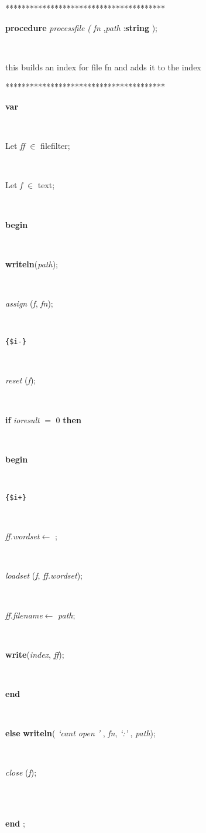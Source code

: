 \documentclass[10pt, a4paper]{article}
\begin{document}
\begin{tabbing}
***\=***\=***\=***\=***\=***\=***\=***\=***\=***\=***\=***\=***\=\kill
\parbox{14cm}{\textsf{\textbf{procedure}  \textit{processfile} \textit{(} \textit{fn} ,\textit{path} :\textbf{string} );}}\\
\end{tabbing}
this builds an index for file fn and adds it to the index
\begin{tabbing}
***\=***\=***\=***\=***\=***\=***\=***\=***\=***\=***\=***\=***\=\kill
\\
\+\parbox{14cm}{\textsf{\textbf{var} }}\\
\parbox{14cm}{\textsf{Let \textit{ff} $\in$ filefilter;}}\\
\parbox{14cm}{\textsf{Let \textit{f} $\in$ text;}}\\
\-\<\+\parbox{14cm}{\textsf{\textbf{begin} }}\\
\parbox{14cm}{\textsf{\textbf{writeln}(\textit{path})}; }\\
\parbox{14cm}{\textsf{\textit{assign} (\textit{f}, \textit{fn})}; }\\
\parbox{14cm}{\texttt{\small{\{\$i-\}}}}\\
\parbox{14cm}{\textsf{\textit{reset} (\textit{f})}; }\\
\+\parbox{14cm}{\textsf {\textbf {if } \textsf{\textit{ioresult} $=$ 0} \textbf{ then } }}\\
\<\parbox{14cm}{\textsf{\textbf{begin} }}\\
\parbox{14cm}{\texttt{\small{\{\$i+\}}}}\\
\parbox{14cm}{\textsf{\textit{ff.wordset}$\leftarrow$ \textit{}}; }\\
\parbox{14cm}{\textsf{\textit{loadset} (\textit{f}, \textit{ff.wordset})}; }\\
\parbox{14cm}{\textsf{\textit{ff.filename}$\leftarrow$ \textit{path}}; }\\
\parbox{14cm}{\textsf{\textbf{write}(\textit{index}, \textit{ff})}; }\\
\<\-\parbox{14cm}{\textsf{\textbf{end} }}\\
\parbox{14cm}{\textsf {\textbf {else } \textsf{\textbf{writeln}(\textit{\textrm{\textup { `cant open ' } }}, \textit{fn}, \textit{\textrm{\textup { `:' } }}, \textit{path})}; }}\\
\parbox{14cm}{\textsf{\textit{close} (\textit{f})}; }\\
\\
\<\-\parbox{14cm}{\textsf{\textbf{end} ;}}\\
\end{tabbing}
\end{document}
